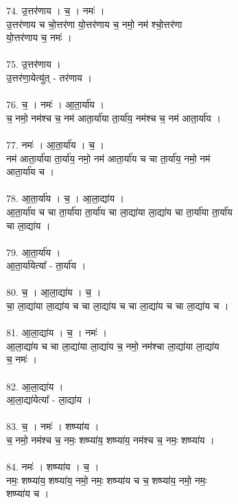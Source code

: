 74. उ॒त्तर॑णाय । च॒ । नमः॑ ।\\
उ॒त्तर॑णाय च चो॒त्तर॑णा यो॒त्तर॑णाय च॒ नमो॒ नम॑ श्चो॒त्तर॑णा\\
यो॒त्तर॑णाय च॒ नमः॑ ।\\
\\
75. उ॒त्तर॑णाय ।\\
उ॒त्तर॑णा॒येत्यु॑त् - तर॑णाय ।\\
\\
76. च॒ । नमः॑ । आ॒ता॒र्या॑य ।\\
च॒ नमो॒ नम॑श्च च॒ नम॑ आता॒र्या॑या ता॒र्या॑य॒ नम॑श्च च॒ नम॑ आता॒र्या॑य ।\\
\\
77. नमः॑ । आ॒ता॒र्या॑य । च॒ ।\\
नम॑ आता॒र्या॑या ता॒र्या॑य॒ नमो॒ नम॑ आता॒र्या॑य च चा ता॒र्या॑य॒ नमो॒ नम॑\\
आता॒र्या॑य च ।\\
\\
78. आ॒ता॒र्या॑य । च॒ । आ॒ला॒द्या॑य ।\\
आ॒ता॒र्या॑य च चा ता॒र्या॑या ता॒र्या॑य चा ला॒द्या॑या ला॒द्या॑य चा ता॒र्या॑या ता॒र्या॑य\\
चा ला॒द्या॑य ।\\
\\
79. आ॒ता॒र्या॑य ।\\
आ॒ता॒र्या॑येत्या᳚ - ता॒र्या॑य ।\\
\\
80. च॒ । आ॒ला॒द्या॑य । च॒ ।\\
चा॒ ला॒द्या॑या ला॒द्या॑य च चा ला॒द्या॑य च चा ला॒द्या॑य च चा ला॒द्या॑य च ।\\
\\
81. आ॒ला॒द्या॑य । च॒ । नमः॑ ।\\
आ॒ला॒द्या॑य च चा ला॒द्या॑या ला॒द्या॑य च॒ नमो॒ नम॑श्चा ला॒द्या॑या ला॒द्या॑य\\
च॒ नमः॑ ।\\
\\
82. आ॒ला॒द्या॑य ।\\
आ॒ला॒द्या॑येत्या᳚ - ला॒द्या॑य ।\\
\\
83. च॒ । नमः॑ । शष्प्या॑य ।\\
च॒ नमो॒ नम॑श्च च॒ नमः॒ शष्प्या॑य॒ शष्प्या॑य॒ नम॑श्च च॒ नमः॒ शष्प्या॑य ।\\
\\
84. नमः॑ । शष्प्या॑य । च॒ ।\\
नमः॒ शष्प्या॑य॒ शष्प्या॑य॒ नमो॒ नमः॒ शष्प्या॑य च च॒ शष्प्या॑य॒ नमो॒ नमः॒\\
शष्प्या॑य च ।\\
